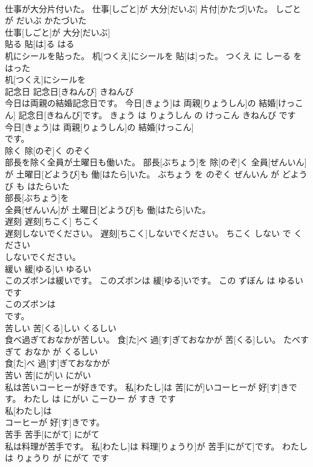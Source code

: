 \documentclass[8pt]{extreport}
\begin{document}
\begin{CJK}{UTF8}{min}
\\	仕事が大分片付いた。	仕事[しごと]が 大分[だいぶ] 片付[かたづ]いた。	しごと が だいぶ かたづいた	
\\	仕事[しごと]が 大分[だいぶ]
\\	貼る	貼[は]る	はる	
\\	机にシールを貼った。	机[つくえ]にシールを 貼[は]った。	つくえ に しーる を はった	
\\	机[つくえ]にシールを
\\	記念日	記念日[きねんび]	きねんび	
\\	今日は両親の結婚記念日です。	今日[きょう]は 両親[りょうしん]の 結婚[けっこん] 記念日[きねんび]です。	きょう は りょうしん の けっこん きねんび です	
\\	今日[きょう]は 両親[りょうしん]の 結婚[けっこん]
\\	です。			
\\	除く	除[のぞ]く	のぞく	
\\	部長を除く全員が土曜日も働いた。	部長[ぶちょう]を 除[のぞ]く 全員[ぜんいん]が 土曜日[どようび]も 働[はたら]いた。	ぶちょう を のぞく ぜんいん が どようび も はたらいた	
\\	部長[ぶちょう]を
\\	全員[ぜんいん]が 土曜日[どようび]も 働[はたら]いた。			
\\	遅刻	遅刻[ちこく]	ちこく	
\\	遅刻しないでください。	遅刻[ちこく]しないでください。	ちこく しない で ください	
\\	しないでください。			
\\	緩い	緩[ゆる]い	ゆるい	
\\	このズボンは緩いです。	このズボンは 緩[ゆる]いです。	この ずぼん は ゆるい です	
\\	このズボンは
\\	です。			
\\	苦しい	苦[くる]しい	くるしい	
\\	食べ過ぎておなかが苦しい。	食[た]べ 過[す]ぎておなかが 苦[くる]しい。	たべすぎて おなか が くるしい	
\\	食[た]べ 過[す]ぎておなかが
\\	苦い	苦[にが]い	にがい	
\\	私は苦いコーヒーが好きです。	私[わたし]は 苦[にが]いコーヒーが 好[す]きです。	わたし は にがい こーひー が すき です	
\\	私[わたし]は
\\	コーヒーが 好[す]きです。			
\\	苦手	苦手[にがて]	にがて	
\\	私は料理が苦手です。	私[わたし]は 料理[りょうり]が 苦手[にがて]です。	わたし は りょうり が にがて です	

\end{CJK}
\end{document}
